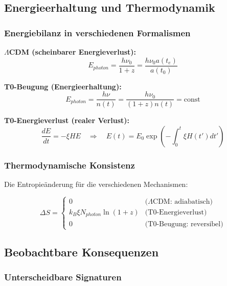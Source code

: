 \documentclass[12pt,a4paper]{article}
\theoremstyle{definition}
\begin{document}
\subsection{Energieerhaltung und Thermodynamik}
\label{subsec:energy_conservation}

\subsubsection{Energiebilanz in verschiedenen Formalismen}

\textbf{\(\Lambda\)CDM (scheinbarer Energieverlust):}
\begin{equation}
	E_{photon} = \frac{h\nu_0}{1+z} = \frac{h\nu_0 a(t_e)}{a(t_0)}
\end{equation}

\textbf{T0-Beugung (Energieerhaltung):}
\begin{equation}
	E_{photon} = \frac{h\nu}{n(t)} = \frac{h\nu_0}{(1+z)n(t)} = \text{const}
\end{equation}

\textbf{T0-Energieverlust (realer Verlust):}
\begin{equation}
	\frac{dE}{dt} = -\xi H E \quad \Rightarrow \quad E(t) = E_0 \exp\left(-\int_0^t \xi H(t') dt'\right)
\end{equation}

\subsubsection{Thermodynamische Konsistenz}

Die Entropieänderung für die verschiedenen Mechanismen:

\begin{equation}
	\Delta S = \begin{cases}
		0 & \text{(\(\Lambda\)CDM: adiabatisch)} \\
		k_B \xi N_{photon} \ln(1+z) & \text{(T0-Energieverlust)} \\
		0 & \text{(T0-Beugung: reversibel)}
	\end{cases}
\end{equation}

\subsection{Beobachtbare Konsequenzen}
\label{subsec:observables}

\subsubsection{Unterscheidbare Signaturen}
\end{document}
